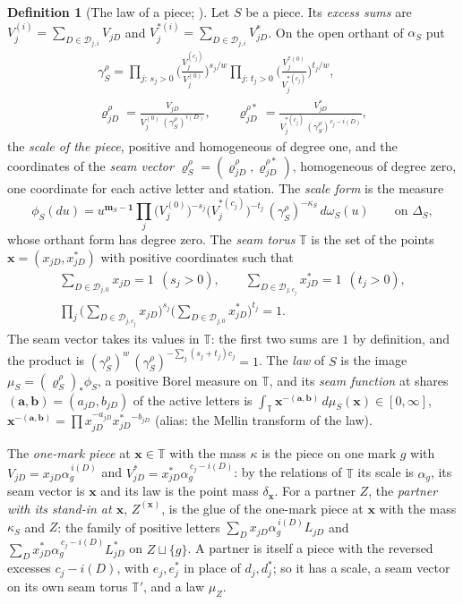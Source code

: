 \documentclass[11pt]{article}
\theoremstyle{plain}
\theoremstyle{definition}
\newtheorem{defn}[prop]{Definition}
\theoremstyle{remark}
\newcommand{\cD}{\mathcal D}
\newcommand{\TT}{\mathbb T}
\newcommand{\bm}{\mathbf m}
\newcommand{\bx}{\mathbf x}
\begin{document}
\begin{defn}[The law of a piece; {\cite[Def.~27.5, p.~227]{F}}]\label{def:law}
Let $S$ be a piece. Its \emph{excess sums} are $V^{(i)}_j=\sum_{D\in\cD_{j,i}}V_{jD}$ and $V^{\ast(i)}_j=\sum_{D\in\cD_{j,i}}V^\ast_{jD}$. On the open orthant of $\alpha_S$ put
\begin{gather*}
\gamma^\rho_S=\prod_{j:\,s_j>0}\Big(\frac{V^{(c_j)}_j}{V^{(0)}_j}\Big)^{s_j/w}\prod_{j:\,t_j>0}\Big(\frac{V^{\ast(0)}_j}{V^{\ast(c_j)}_j}\Big)^{t_j/w},\\
\varrho^\rho_{jD}=\frac{V_{jD}}{V^{(0)}_j\,(\gamma^\rho_S)^{i(D)}},\qquad \varrho^{\rho\ast}_{jD}=\frac{V^\ast_{jD}}{V^{\ast(c_j)}_j\,(\gamma^\rho_S)^{c_j-i(D)}},
\end{gather*}
the \emph{scale of the piece}, positive and homogeneous of degree one, and the coordinates of the \emph{seam vector} $\boldsymbol\varrho^\rho_S=(\varrho^\rho_{jD},\varrho^{\rho\ast}_{jD})$, homogeneous of degree zero, one coordinate for each active letter and station. The \emph{scale form} is the measure
\[
\phi_S(du)=u^{\bm_S-\mathbf 1}\prod_j\big(V^{(0)}_j\big)^{-s_j}\big(V^{\ast(c_j)}_j\big)^{-t_j}\,(\gamma^\rho_S)^{-\kappa_S}\,d\omega_S(u)\qquad\text{on }\Delta_S,
\]
whose orthant form has degree zero. The \emph{seam torus} $\TT$ is the set of the points $\bx=(x_{jD},x^\ast_{jD})$ with positive coordinates such that
\begin{gather*}
\sum_{D\in\cD_{j,0}}x_{jD}=1\ \ (s_j>0),\qquad \sum_{D\in\cD_{j,c_j}}x^\ast_{jD}=1\ \ (t_j>0),\\
\prod_j\Big(\sum_{D\in\cD_{j,c_j}}x_{jD}\Big)^{s_j}\Big(\sum_{D\in\cD_{j,0}}x^\ast_{jD}\Big)^{t_j}=1 .
\end{gather*}
The seam vector takes its values in $\TT$: the first two sums are $1$ by definition, and the product is $(\gamma^\rho_S)^{w}\,(\gamma^\rho_S)^{-\sum_j(s_j+t_j)c_j}=1$. The \emph{law} of $S$ is the image $\mu_S=(\boldsymbol\varrho^\rho_S)_\ast\phi_S$, a positive Borel measure on $\TT$, and its \emph{seam function} at shares $(\mathbf a,\mathbf b)=(a_{jD},b_{jD})$ of the active letters is $\int_{\TT}\bx^{-(\mathbf a,\mathbf b)}\,d\mu_S(\bx)\in[0,\infty]$, $\bx^{-(\mathbf a,\mathbf b)}=\prod x_{jD}^{-a_{jD}}x^{\ast}_{jD}{}^{-b_{jD}}$ (alias: the Mellin transform of the law).

The \emph{one-mark piece} at $\bx\in\TT$ with the mass $\kappa$ is the piece on one mark $g$ with $V_{jD}=x_{jD}\alpha_g^{\,i(D)}$ and $V^\ast_{jD}=x^\ast_{jD}\alpha_g^{\,c_j-i(D)}$: by the relations of $\TT$ its scale is $\alpha_g$, its seam vector is $\bx$ and its law is the point mass $\delta_{\bx}$. For a partner $Z$, the \emph{partner with its stand-in at $\bx$}, $Z^{(\bx)}$, is the glue of the one-mark piece at $\bx$ with the mass $\kappa_S$ and $Z$: the family of positive letters $\sum_Dx_{jD}\alpha_g^{\,i(D)}L_{jD}$ and $\sum_Dx^\ast_{jD}\alpha_g^{\,c_j-i(D)}L^\ast_{jD}$ on $Z\sqcup\{g\}$. A partner is itself a piece with the reversed excesses $c_j-i(D)$, with $e_j,e^\ast_j$ in place of $d_j,d^\ast_j$; so it has a scale, a seam vector on its own seam torus $\TT'$, and a law $\mu_Z$.
\end{defn}
\end{document}
